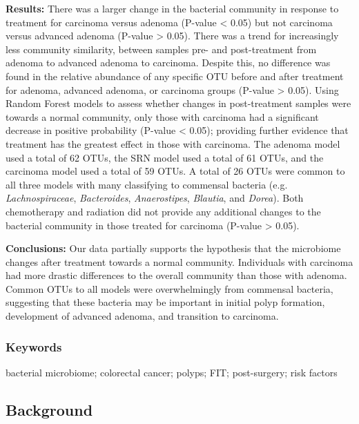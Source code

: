 \documentclass[12pt,]{article}
\begin{document}
\textbf{Results:} There was a larger change in the bacterial community
in response to treatment for carcinoma versus adenoma (P-value
\textless{} 0.05) but not carcinoma versus advanced adenoma (P-value
\textgreater{} 0.05). There was a trend for increasingly less community
similarity, between samples pre- and post-treatment from adenoma to
advanced adenoma to carcinoma. Despite this, no difference was found in
the relative abundance of any specific OTU before and after treatment
for adenoma, advanced adenoma, or carcinoma groups (P-value
\textgreater{} 0.05). Using Random Forest models to assess whether
changes in post-treatment samples were towards a normal community, only
those with carcinoma had a significant decrease in positive probability
(P-value \textless{} 0.05); providing further evidence that treatment
has the greatest effect in those with carcinoma. The adenoma model used
a total of 62 OTUs, the SRN model used a total of 61 OTUs, and the
carcinoma model used a total of 59 OTUs. A total of 26 OTUs were common
to all three models with many classifying to commensal bacteria (e.g.
\emph{Lachnospiraceae}, \emph{Bacteroides}, \emph{Anaerostipes},
\emph{Blautia}, and \emph{Dorea}). Both chemotherapy and radiation did
not provide any additional changes to the bacterial community in those
treated for carcinoma (P-value \textgreater{} 0.05).

\textbf{Conclusions:} Our data partially supports the hypothesis that
the microbiome changes after treatment towards a normal community.
Individuals with carcinoma had more drastic differences to the overall
community than those with adenoma. Common OTUs to all models were
overwhelmingly from commensal bacteria, suggesting that these bacteria
may be important in initial polyp formation, development of advanced
adenoma, and transition to carcinoma.

\newpage

\subsubsection{Keywords}\label{keywords}

bacterial microbiome; colorectal cancer; polyps; FIT; post-surgery; risk
factors

\newpage

\subsection{Background}\label{background}
\end{document}
